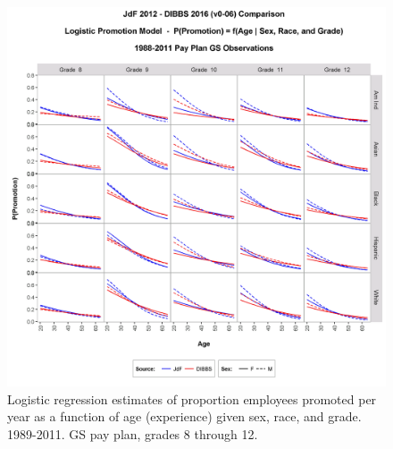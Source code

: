 \documentclass[10pt, letterpaper]{article}
\begin{document}
\begin{spacing}{1.0}
\begin{figure}[]
    \centering
    \includegraphics[width=6in, trim={0 0 0 1in}, clip]{PromotionSexRaceageGS8-12Model.png}
    \caption{Logistic regression estimates of proportion employees promoted per year as a function of age (experience) given sex, race, and grade.  1989-2011.  GS pay plan, grades 8 through 12.}
    \label{figure:PromotionSexRaceageGS8-12Model}
\end{figure}

\clearpage


\end{spacing}
\end{document}
